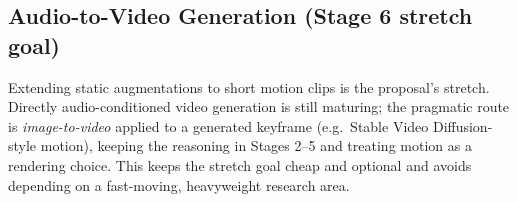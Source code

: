 \documentclass[11pt,a4paper]{article}
\begin{document}
\subsection{Audio-to-Video Generation (Stage 6 stretch goal)}
Extending static augmentations to short motion clips is the proposal's stretch. Directly
audio-conditioned video generation is still maturing; the pragmatic route is \emph{image-to-video}
applied to a generated keyframe (e.g.\ Stable Video Diffusion-style motion), keeping the reasoning
in Stages 2--5 and treating motion as a rendering choice. This keeps the stretch goal cheap and
optional and avoids depending on a fast-moving, heavyweight research area.
\end{document}
